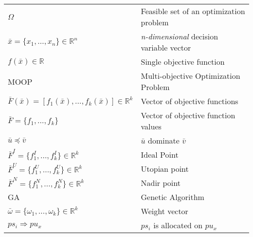 \begin{center}
\begin{longtable}{ll}
    $\Omega$                                & Feasible set of an optimization problem \\
    $\bar x = \{x_1,\ldots, x_n\} \in \mathbb{R}^n$ & \textit{n-dimensional} decision variable vector \\
    $f(\bar x) \in \mathbb{R}$              & Single objective function \\ 
    MOOP                                     & Multi-objective Optimization Problem \\
    $\bar F(\bar x) = [f_1(\bar x), \ldots , f_k(\bar x)] \in \mathbb{R}^{k}$ & Vector of objective functions \\
    $\bar F = \{f_1,\ldots, f_k\}$          & Vector of objective function values \\
    $\bar u \preceq \bar v$                 & $\bar u$ dominate $\bar v$ \\
    $\bar F^I = \{ f^I_1, \ldots , f^I_k\} \in \mathbb{R}^{k}$ & Ideal Point \\
    $\bar F^U = \{ f^U_1, \ldots , f^U_k\} \in \mathbb{R}^{k}$ & Utopian point \\
    $\bar F^N = \{ f^N_1, \ldots , f^N_k\} \in \mathbb{R}^{k}$ & Nadir point \\
    GA                                      & Genetic Algorithm \\
    $\bar \omega = \{\omega_1, \ldots , \omega_k \} \in \mathbb{R}^{k}$ & Weight vector \\
	$ps_i \Rightarrow pu_x$                 & $ps_i$ is allocated on $pu_x$ \\
\end{longtable}
\addtocounter{table}{-1}
\label{table5}
\end{center}
\normalsize